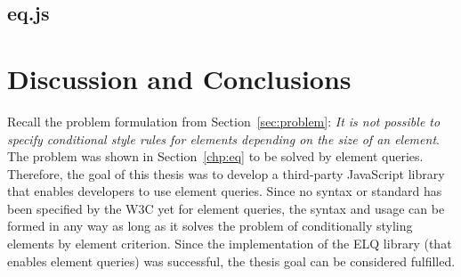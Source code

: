 \documentclass[a4paper,11pt]{kth-mag}
\newcommand{\problemformulation}{\emph{It is not possible to specify conditional style rules for \glspl{element} depending on the size of an element}}
\begin{document}
    \section{eq.js}



  \chapter{Discussion and Conclusions}
    Recall the problem formulation from Section~\ref{sec:problem}: \problemformulation.
    The problem was shown in Section~\ref{chp:eq} to be solved by element queries.
    Therefore, the goal of this thesis was to develop a third-party JavaScript library that enables developers to use element queries.
    Since no syntax or standard has been specified by the \gls{W3C} yet for element queries, the syntax and usage can be formed in any way as long as it solves the problem of conditionally styling elements by element criterion.
    Since the implementation of the \gls{ELQ} library (that enables element queries) was successful, the thesis goal can be considered fulfilled.
\end{document}
